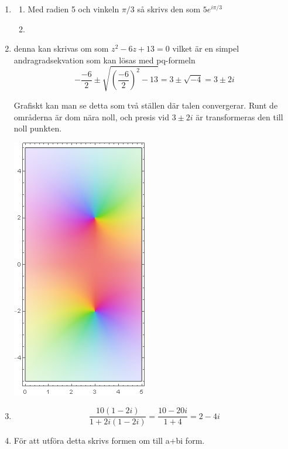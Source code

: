 \documentclass[a4paper,12pt]{article}
\begin{document}
\begin{enumerate}
\begin{enumerate}
          \end{enumerate}
          \item \begin{enumerate}
                \item Med radien 5 och vinkeln $\pi/3$ så 
                skrivs den som $5e^{i\pi/3}$

                \item 
          \end{enumerate}

          \item denna kan skrivas om som 
          $z^2-6z+13=0$ vilket är en simpel andragradsekvation som
          kan lösas med pq-formeln 
          $$-\frac{-6}{2}\pm\sqrt{(\frac{-6}{2})^2-13}=3\pm\sqrt{-4}=3\pm 2i$$
          
          Grafiskt kan man se detta som två ställen där talen convergerar.
          Runt de områderna är dom nära noll, och presis vid $3\pm 2i$ är 
          transformeras den till noll punkten.
          \begin{center}
                \includegraphics[scale=0.6]{Figur 2.png}
          \end{center}
          \item 
          $$\frac{10(1-2i)}{1+2i(1-2i)}=\frac{10-20i}{1+4}=2-4i$$

          \item För att utföra detta skrivs formen om till a+bi form.
          
          
\end{enumerate}
\end{document}
